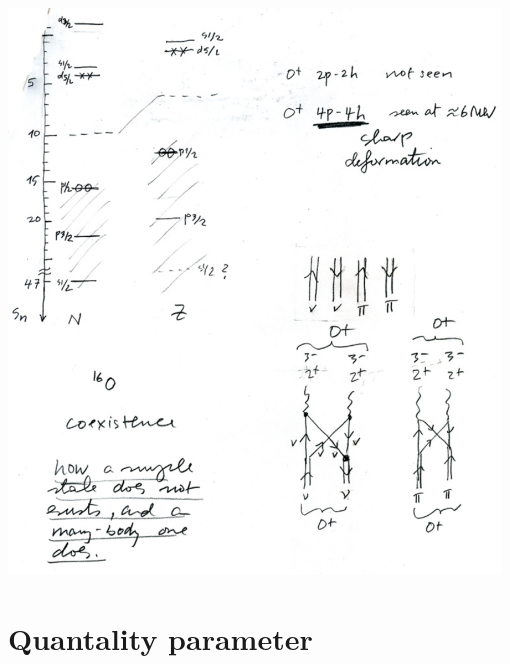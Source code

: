 \documentclass[a4paper,onecolumn,superscriptaddress,12pt,nofootinbib,twoside,raggedfooter,notitlepage]{revtex4-1}
\begin{document}
\begin{center}
	\includegraphics[width=0.98\textwidth]{figs/fig_c6}
\end{center}






\pagebreak

\section{Quantality parameter}
\end{document}
